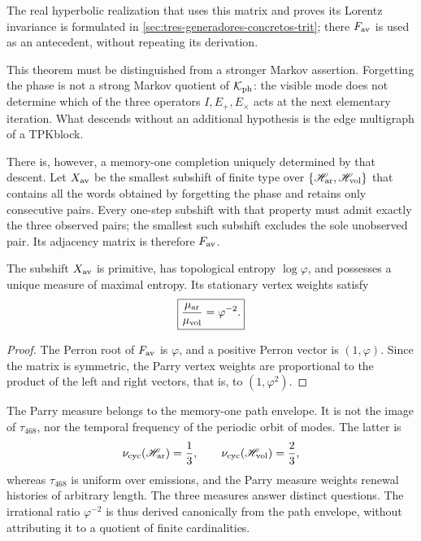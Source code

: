 The real hyperbolic realization that uses this matrix and proves its
Lorentz invariance is formulated in
\cref{sec:tres-generadores-concretos-trit}; there \(F_{\rm av}\) is used
as an antecedent, without repeating its derivation.

This theorem must be distinguished from a stronger Markov assertion.
Forgetting the phase is not a strong Markov quotient of
\(\mathcal K_{\rm ph}\): the visible mode does not determine which of the three
operators \(I,E_+,E_\times\) acts at the next elementary iteration. What descends
without an additional hypothesis is the edge multigraph of a TPK\@ block.

There is, however, a memory-one completion uniquely determined by that descent. Let \(X_{\rm av}\) be the smallest subshift of finite type over \(\{\mathscr H_{\rm ar},\mathscr H_{\rm vol}\}\) that contains all the words obtained by forgetting the phase and retains only consecutive pairs. Every one-step subshift with that property must admit exactly the three observed pairs; the smallest such subshift excludes the sole unobserved pair. Its adjacency matrix is therefore \(F_{\rm av}\).

\begin{corollary}
\label{p12-83-c16-s2:cor:parry-envolvente-fav}
The subshift \(X_{\rm av}\) is primitive, has topological entropy
\(\log\varphi\), and possesses a unique measure of maximal entropy. Its stationary
vertex weights satisfy
\[
 \boxed{
 \frac{\mu_{\rm ar}}{\mu_{\rm vol}}=\varphi^{-2}.}
\]
\end{corollary}

\begin{proof}
The Perron root of \(F_{\rm av}\) is \(\varphi\), and a positive Perron
vector is \((1,\varphi)\). Since the matrix is symmetric, the Parry vertex
weights are proportional to the product of the left and right vectors,
that is, to \((1,\varphi^2)\).
\end{proof}

The Parry measure belongs to the memory-one path envelope. It is not
the image of \(\tau_{468}\), nor the temporal frequency of the periodic orbit
of modes. The latter is
\[
 \nu_{\rm cyc}(\mathscr H_{\rm ar})=\frac13,\qquad
 \nu_{\rm cyc}(\mathscr H_{\rm vol})=\frac23,
\]
whereas \(\tau_{468}\) is uniform over emissions, and the Parry measure
weights renewal histories of arbitrary length. The three measures
answer distinct questions. The irrational ratio
\(\varphi^{-2}\) is thus derived canonically from the path envelope,
without attributing it to a quotient of finite cardinalities.


